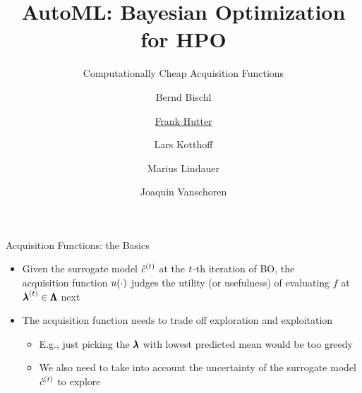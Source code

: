 


\title{AutoML: Bayesian Optimization for HPO}
\subtitle{Computationally Cheap Acquisition Functions}
\author[Marius Lindauer]{Bernd Bischl \and \underline{Frank Hutter} \and Lars Kotthoff\newline \and Marius Lindauer \and Joaquin Vanschoren}
\institute{}
\date{}


\maketitle

\begin{frame}[c]{Acquisition Functions: the Basics}
\begin{itemize}
    \item Given the surrogate model ${\hat{c}}^{(t)}$ at the $t$-th iteration of BO, the \\
    \alert{acquisition function $u(\cdot)$ judges the utility (or usefulness) of evaluating $f$ at ${\pmb{\lambda}}^{(t)}\in \pmb{\Lambda}$ next}
    \pause
    \bigskip
    \item The acquisition function needs to \alert{trade off exploration and exploitation}
    \begin{itemize}
        \item E.g., just picking the $\pmb{\lambda}$ with lowest predicted mean would be too greedy
        \item We also need to take into account the uncertainty of the surrogate model ${\hat{c}}^{(t)}$ to explore
    \end{itemize}
\end{itemize}

\end{frame}
